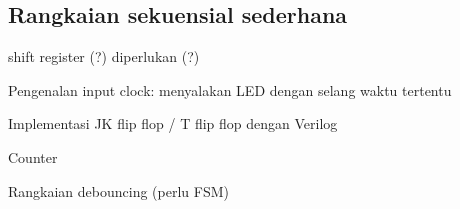 \subsection{Rangkaian sekuensial sederhana}

shift register (?) diperlukan (?)

Pengenalan input clock:
menyalakan LED dengan selang waktu tertentu

Implementasi JK flip flop / T flip flop dengan Verilog

Counter

Rangkaian debouncing (perlu FSM)

